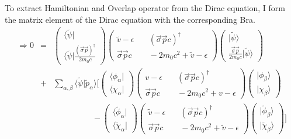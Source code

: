 \documentclass[11pt,a4paper]{report}
\begin{document}
To extract Hamiltonian and Overlap operator from the Dirac equation, I
form the matrix element of the Dirac equation with the corresponding
Bra.
\begin{eqnarray}
\Rightarrow
0&=&\left(\begin{array}{c}\langle\tilde{\psi}|\\
\langle\tilde{\psi}|\frac{(\vec{\sigma}\vec{p})^\dagger}{2m_0c}\end{array}\right)
\left(\begin{array}{cc}
\tilde{v}-\epsilon &\quad (\vec{\sigma}\vec{p}c)^\dagger \\
\vec{\sigma}\vec{p}c &\quad -2m_0c^2+\tilde{v}-\epsilon\end{array}\right)
\left(\begin{array}{c}|\tilde{\psi}\rangle\\
\frac{\vec{\sigma}\vec{p}}{2m_0c}|\tilde{\psi}\rangle\end{array}\right)
\nonumber\\
&+&\sum_{\alpha,\beta}\langle\tilde{\psi}|\tilde{p}_\alpha\rangle
\biggl[
%
\left(\begin{array}{c}\langle\phi_\alpha|\\
\langle\chi_\alpha|
\end{array}\right)
\left(\begin{array}{cc}
v-\epsilon &\quad (\vec{\sigma}\vec{p}c)^\dagger\\
\vec{\sigma}\vec{p}c &\quad -2m_0c^2+v-\epsilon\end{array}\right)
\left(\begin{array}{c}|\phi_\beta\rangle\\
|\chi_\beta\rangle\end{array}\right)
%
\nonumber\\
&&\hspace{2cm}-\left(\begin{array}{c}\langle\tilde{\phi}_\alpha|\\
\langle\tilde{\chi}_\alpha|
\end{array}\right)
\left(\begin{array}{cc}
\tilde{v}-\epsilon &\quad (\vec{\sigma}\vec{p}c)^\dagger\\
\vec{\sigma}\vec{p}c &\quad -2m_0c^2+\tilde{v}-\epsilon\end{array}\right)
\left(\begin{array}{c}|\tilde{\phi}_\beta\rangle\\
|\tilde{\chi}_\beta\rangle\end{array}\right)
%
\biggr]

\end{eqnarray}
\end{document}
